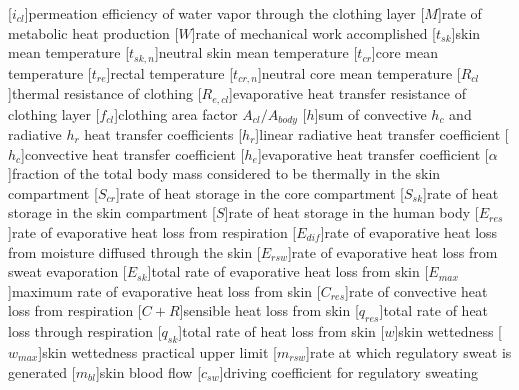\begin{acronym}[longest]
        [$i_{cl}$]{permeation efficiency of water vapor through the clothing layer}
    [$M$]{rate of metabolic heat production}
    [$W$]{rate of mechanical work accomplished}
    [$t_{sk}$]{skin mean temperature}
    [$t_{sk,n}$]{neutral skin mean temperature}
    [$t_{cr}$]{core mean temperature}
    [$t_{re}$]{rectal temperature}
    [$t_{cr,n}$]{neutral core mean temperature}
    [$R_{cl}$]{thermal resistance of clothing}
    [$R_{e,cl}$]{evaporative heat transfer resistance of clothing layer}
    [$f_{cl}$]{clothing area factor $A_{cl}/A_{body}$}
    [$h$]{sum of convective $h_{c}$ and radiative $h_{r}$ heat transfer coefficients}
    [$h_{r}$]{linear radiative heat transfer coefficient}
    [$h_{c}$]{convective heat transfer coefficient}
    [$h_{e}$]{evaporative heat transfer coefficient}
    [$\alpha$]{fraction of the total body mass considered
to be thermally in the skin compartment}
        [$S_{cr}$]{rate of heat storage in the core compartment}
    [$S_{sk}$]{rate of heat storage in the skin compartment}
    [$S$]{rate of heat storage in the human body}
    [$E_{res}$]{rate of evaporative heat loss from respiration}
    [$E_{dif}$]{rate of evaporative heat loss from moisture diffused through the skin}
    [$E_{rsw}$]{rate of evaporative heat loss from sweat evaporation}
    [$E_{sk}$]{total rate of evaporative heat loss from skin}
    [$E_{max}$]{maximum rate of evaporative heat loss from skin}
    [$C_{res}$]{rate of convective heat loss from respiration}
    [$C + R$]{sensible heat loss from skin}
    [$q_{res}$]{total rate of heat loss through respiration}
    [$q_{sk}$]{total rate of heat loss from skin}
    [$w$]{skin wettedness}
    [$w_{max}$]{skin wettedness practical upper limit}
    [$m_{rsw}$]{rate at which regulatory sweat is generated}
    [$m_{bl}$]{skin blood flow}
    [$c_{sw}$]{driving coefficient for regulatory sweating}


\end{acronym}
